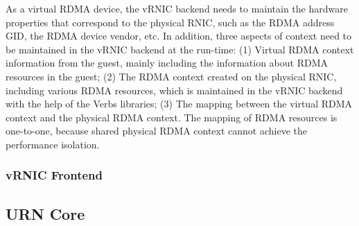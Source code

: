 As a virtual RDMA device, the vRNIC backend needs to maintain the hardware properties that correspond to the physical RNIC, such as the RDMA address GID, the RDMA device vendor, etc. In addition, three aspects of context need to be maintained in the vRNIC backend at the run-time:
(1) Virtual RDMA context information from the guest, mainly including the information about RDMA resources in the guest;
(2) The RDMA context created on the physical RNIC,  including various RDMA resources, which is maintained in the vRNIC backend with the help of the Verbs libraries;
(3) The mapping between the virtual RDMA context and the physical RDMA context. The mapping of RDMA resources is one-to-one, because shared physical RDMA context cannot achieve the performance isolation.

\subsubsection{vRNIC Frontend}



\subsection{URN Core}


